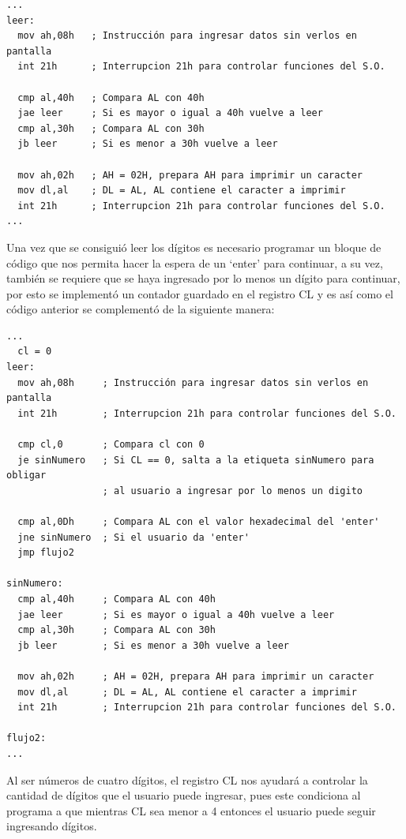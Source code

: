 \documentclass[letter,12 pt,titlepage]{article}
\begin{document}
    \begin{verbatim}
...
leer:
  mov ah,08h   ; Instrucción para ingresar datos sin verlos en pantalla
  int 21h      ; Interrupcion 21h para controlar funciones del S.O.

  cmp al,40h   ; Compara AL con 40h
  jae leer     ; Si es mayor o igual a 40h vuelve a leer
  cmp al,30h   ; Compara AL con 30h
  jb leer      ; Si es menor a 30h vuelve a leer

  mov ah,02h   ; AH = 02H, prepara AH para imprimir un caracter
  mov dl,al    ; DL = AL, AL contiene el caracter a imprimir
  int 21h      ; Interrupcion 21h para controlar funciones del S.O.
...
    \end{verbatim}
    
    Una vez que se consiguió leer los dígitos es necesario programar un bloque de código que nos permita hacer la espera de un `enter' para continuar, a su vez, también se requiere que se haya ingresado por lo menos un dígito para continuar, por esto se implementó un contador guardado en el registro CL y es así como el código anterior se complementó de la siguiente manera:

    \begin{verbatim}
...
  cl = 0
leer:
  mov ah,08h     ; Instrucción para ingresar datos sin verlos en pantalla
  int 21h        ; Interrupcion 21h para controlar funciones del S.O.

  cmp cl,0       ; Compara cl con 0
  je sinNumero   ; Si CL == 0, salta a la etiqueta sinNumero para obligar 
                 ; al usuario a ingresar por lo menos un digito

  cmp al,0Dh     ; Compara AL con el valor hexadecimal del 'enter'
  jne sinNumero  ; Si el usuario da 'enter'
  jmp flujo2

sinNumero:
  cmp al,40h     ; Compara AL con 40h
  jae leer       ; Si es mayor o igual a 40h vuelve a leer
  cmp al,30h     ; Compara AL con 30h
  jb leer        ; Si es menor a 30h vuelve a leer

  mov ah,02h     ; AH = 02H, prepara AH para imprimir un caracter
  mov dl,al      ; DL = AL, AL contiene el caracter a imprimir
  int 21h        ; Interrupcion 21h para controlar funciones del S.O.

flujo2:
...
    \end{verbatim}

    Al ser números de cuatro dígitos, el registro CL nos ayudará a controlar la cantidad de dígitos que el usuario puede ingresar, pues este condiciona al programa a que mientras CL sea menor a 4 entonces el usuario puede seguir ingresando dígitos.
\end{document}
